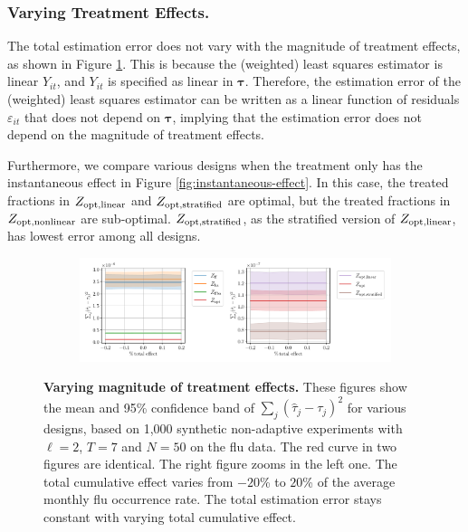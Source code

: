 \subsubsection{Varying Treatment Effects.}\label{subsubsec:magnitude-treatment-effect}

The total estimation error does not vary with the magnitude of treatment effects, as shown in Figure \ref{fig:varying-effect}. This is because the (weighted) least squares estimator is linear $Y_{it}$, and $Y_{it}$ is specified as linear in $\bm{\tau}$. Therefore, the estimation error of the (weighted) least squares estimator can be written as a linear function of residuals $\varepsilon_{it}$ that does not depend on $\bm{\tau}$, implying that the estimation error does not depend on the magnitude of treatment effects. 

Furthermore, we compare various designs when the treatment only has the instantaneous effect in Figure \ref{fig:instantaneous-effect}. In this case, the treated fractions in $Z_{\textnormal{opt},\mathrm{linear}}$ and $Z_{\textnormal{opt},\mathrm{stratified}}$ are optimal, but the treated fractions in $Z_{\textnormal{opt},\mathrm{nonlinear}}$ are sub-optimal. $Z_{\textnormal{opt},\mathrm{stratified}}$, as the stratified version of $Z_{\textnormal{opt},\mathrm{linear}}$, has lowest error among all designs.

\begin{figure}[H]
	\centering
	\begin{subfigure}{1\textwidth}
		\centering
		\includegraphics[width=0.75\linewidth]{plots/empirical/flu/nonadaptive/flu_N_50_T_7_varying_treatment_effect_lag_2_agg.pdf}
	\end{subfigure}
	\vspace{0.01in}
	\caption{\textbf{Varying magnitude of treatment effects.} These figures show the mean and 95\% confidence band of $\sum_{j}(\hat{\tau}_j - \tau_j)^2$ for various designs, based on 1,000 synthetic non-adaptive experiments with $\ell = 2$, $T = 7$ and $N = 50$ on the flu data. The red curve in two figures are identical. The right figure zooms in the left one. The total cumulative effect varies from $-20$\% to $20$\% of the average monthly flu occurrence rate. The total estimation error stays constant with varying total cumulative effect.}
	\label{fig:varying-effect}
\end{figure}

